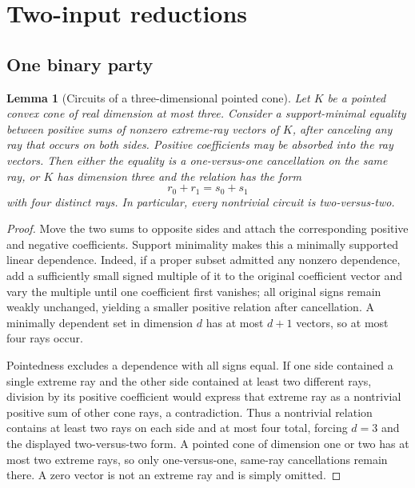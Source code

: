 \documentclass[11pt]{article}
\newtheorem{lemma}[theorem]{Lemma}
\theoremstyle{definition}
\begin{document}
\section{Two-input reductions}
\label{sec:reductions}

\subsection{One binary party}

\begin{lemma}[Circuits of a three-dimensional pointed cone]
\label{lem:lorentz-circuit}
Let \(K\) be a pointed convex cone of real dimension at most three. Consider
a support-minimal equality between positive sums of nonzero extreme-ray
vectors of \(K\), after canceling any ray that occurs on both sides. Positive
coefficients may be absorbed into the ray vectors. Then either the equality
is a one-versus-one cancellation on the same ray, or \(K\) has dimension
three and the relation has the form
\[
r_0+r_1=s_0+s_1
\]
with four distinct rays. In particular, every nontrivial circuit is
two-versus-two.
\end{lemma}

\begin{proof}
Move the two sums to opposite sides and attach the corresponding positive and
negative coefficients. Support minimality makes this a minimally supported
linear dependence. Indeed, if a proper subset admitted any nonzero
dependence, add a sufficiently small signed multiple of it to the original
coefficient vector and vary the multiple until one coefficient first
vanishes; all original signs remain weakly unchanged, yielding a smaller
positive relation after cancellation. A minimally dependent set in
dimension \(d\) has at most \(d+1\) vectors, so at most four rays occur.

Pointedness excludes a dependence with all signs equal. If one side contained
a single extreme ray and the other side contained at least two different
rays, division by its positive coefficient would express that extreme ray as
a nontrivial positive sum of other cone rays, a contradiction. Thus a
nontrivial relation contains at least two rays on each side and at most four
total, forcing \(d=3\) and the displayed two-versus-two form. A pointed cone
of dimension one or two has at most two extreme rays, so only
one-versus-one, same-ray cancellations remain there. A zero vector is not an
extreme ray and is simply omitted.
\end{proof}
\end{document}
